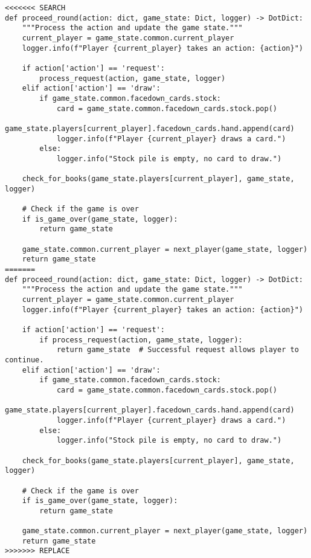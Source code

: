 \begin{tcolorbox}[
breakable,
title=Code Edit Proposal Example,  
colframe=gray, 
colback=white,
]
\begin{lstlisting}[]
<<<<<<< SEARCH
def proceed_round(action: dict, game_state: Dict, logger) -> DotDict:
    """Process the action and update the game state."""
    current_player = game_state.common.current_player
    logger.info(f"Player {current_player} takes an action: {action}")
    
    if action['action'] == 'request':
        process_request(action, game_state, logger)
    elif action['action'] == 'draw':
        if game_state.common.facedown_cards.stock:
            card = game_state.common.facedown_cards.stock.pop()
            game_state.players[current_player].facedown_cards.hand.append(card)
            logger.info(f"Player {current_player} draws a card.")
        else:
            logger.info("Stock pile is empty, no card to draw.")

    check_for_books(game_state.players[current_player], game_state, logger)
    
    # Check if the game is over
    if is_game_over(game_state, logger):
        return game_state
    
    game_state.common.current_player = next_player(game_state, logger)
    return game_state
=======
def proceed_round(action: dict, game_state: Dict, logger) -> DotDict:
    """Process the action and update the game state."""
    current_player = game_state.common.current_player
    logger.info(f"Player {current_player} takes an action: {action}")
    
    if action['action'] == 'request':
        if process_request(action, game_state, logger):
            return game_state  # Successful request allows player to continue.
    elif action['action'] == 'draw':
        if game_state.common.facedown_cards.stock:
            card = game_state.common.facedown_cards.stock.pop()
            game_state.players[current_player].facedown_cards.hand.append(card)
            logger.info(f"Player {current_player} draws a card.")
        else:
            logger.info("Stock pile is empty, no card to draw.")

    check_for_books(game_state.players[current_player], game_state, logger)
    
    # Check if the game is over
    if is_game_over(game_state, logger):
        return game_state
    
    game_state.common.current_player = next_player(game_state, logger)
    return game_state
>>>>>>> REPLACE
\end{lstlisting}
\end{tcolorbox}